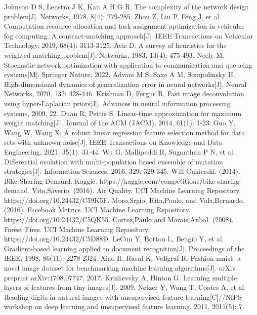 \documentclass{NauThesis}
\begin{document}
\begin{thebibliography}{99}
Johnson D S, Lenstra J K, Kan A H G R. The complexity of the network design problem[J]. Networks, 1978, 8(4): 279-285.
Zhou Z, Liu P, Feng J, et al. Computation resource allocation and task assignment optimization in vehicular fog computing: A contract-matching approach[J]. IEEE Transactions on Vehicular Technology, 2019, 68(4): 3113-3125.
Avis D. A survey of heuristics for the weighted matching problem[J]. Networks, 1983, 13(4): 475-493.
Neely M. Stochastic network optimization with application to communication and queueing systems[M]. Springer Nature, 2022.
Advani M S, Saxe A M, Sompolinsky H. High-dimensional dynamics of generalization error in neural networks[J]. Neural Networks, 2020, 132: 428-446.
Krishnan D, Fergus R. Fast image deconvolution using hyper-Laplacian priors[J]. Advances in neural information processing systems, 2009, 22.
Duan R, Pettie S. Linear-time approximation for maximum weight matching[J]. Journal of the ACM (JACM), 2014, 61(1): 1-23.
Guo Y, Wang W, Wang X. A robust linear regression feature selection method for data sets with unknown noise[J]. IEEE Transactions on Knowledge and Data Engineering, 2021, 35(1): 31-44.
Wu G, Mallipeddi R, Suganthan P N, et al. Differential evolution with multi-population based ensemble of mutation strategies[J]. Information Sciences, 2016, 329: 329-345.
Will Cukierski. (2014). Bike Sharing Demand. Kaggle. https://kaggle.com/competitions/bike-sharing-demand.
Vito,Saverio. (2016). Air Quality. UCI Machine Learning Repository. https://doi.org/10.24432/C59K5F.
Moro,Srgio, Rita,Paulo, and Vala,Bernardo. (2016). Facebook Metrics. UCI Machine Learning Repository. https://doi.org/10.24432/C5QK55.
Cortez,Paulo and Morais,Anbal. (2008). Forest Fires. UCI Machine Learning Repository. https://doi.org/10.24432/C5D88D. 
LeCun Y, Bottou L, Bengio Y, et al. Gradient-based learning applied to document recognition[J]. Proceedings of the IEEE, 1998, 86(11): 2278-2324.
Xiao H, Rasul K, Vollgraf R. Fashion-mnist: a novel image dataset for benchmarking machine learning algorithms[J]. arXiv preprint arXiv:1708.07747, 2017.
Krizhevsky A, Hinton G. Learning multiple layers of features from tiny images[J]. 2009.
Netzer Y, Wang T, Coates A, et al. Reading digits in natural images with unsupervised feature learning[C]//NIPS workshop on deep learning and unsupervised feature learning. 2011, 2011(5): 7.

\end{thebibliography}
\end{document}

